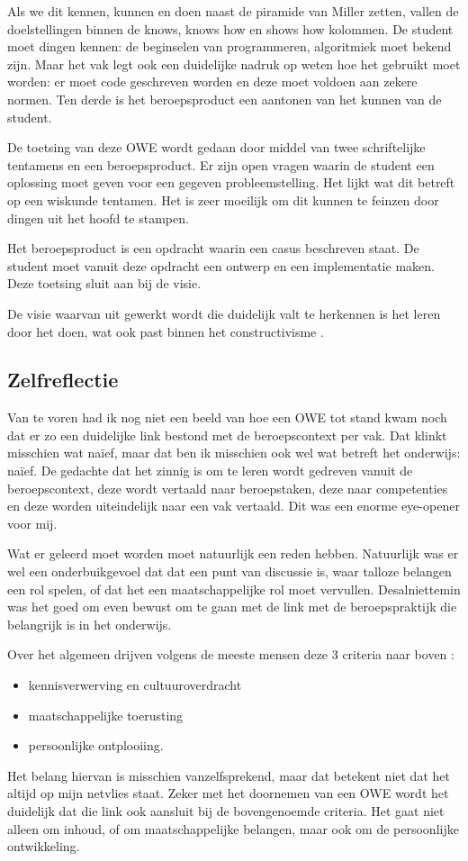 Als we dit kennen, kunnen en doen naast de piramide van Miller zetten, vallen de doelstellingen binnen de knows, knows how en shows how kolommen. De student moet dingen kennen: de beginselen van programmeren, algoritmiek moet bekend zijn. Maar het vak legt ook een duidelijke nadruk op weten hoe het gebruikt moet worden: er moet code geschreven worden en deze moet voldoen aan zekere normen. Ten derde is het beroepsproduct een aantonen van het kunnen van de student.

De toetsing van deze OWE wordt gedaan door middel van twee schriftelijke tentamens en een beroepsproduct. Er zijn open vragen waarin de student een oplossing moet geven voor een gegeven probleemstelling. Het lijkt wat dit betreft op een wiskunde tentamen. Het is zeer moeilijk om dit kunnen te feinzen door dingen uit het hoofd te stampen.

Het beroepsproduct is een opdracht waarin een casus beschreven staat. De student moet vanuit deze opdracht een ontwerp en een implementatie maken. Deze toetsing sluit aan bij de visie.

De visie waarvan uit gewerkt wordt die duidelijk valt te herkennen is het leren door het doen, wat ook past binnen het constructivisme \cite{keursten2006ontwikkeling}.
 
\subsection{Zelfreflectie}
Van te voren had ik nog niet een beeld van hoe een OWE tot stand kwam noch dat er zo een duidelijke link bestond met de beroepscontext per vak. Dat klinkt misschien wat naïef, maar dat ben ik misschien ook wel wat betreft het onderwijs: naïef. De gedachte dat het zinnig is om te leren wordt gedreven vanuit de beroepscontext, deze wordt vertaald naar beroepstaken, deze naar competenties en deze worden uiteindelijk naar een vak vertaald. Dit was een enorme eye-opener voor mij.

Wat er geleerd moet worden moet natuurlijk een reden hebben. Natuurlijk was er wel een onderbuikgevoel dat dat een punt van discussie is, waar talloze belangen een rol spelen, of dat het een maatschappelijke rol moet vervullen. Desalniettemin was het goed om even bewust om te gaan met de link met de beroepspraktijk die belangrijk is in het onderwijs.

Over het algemeen drijven volgens de meeste mensen deze 3 criteria naar boven \cite{thijs2009leerplan} :
\begin{itemize} 
  \item kennisverwerving en cultuuroverdracht
  \item maatschappelijke toerusting
  \item persoonlijke ontplooiing.
\end{itemize}
Het belang hiervan is misschien vanzelfsprekend, maar dat betekent niet dat het altijd op mijn netvlies staat. Zeker met het doornemen van een OWE wordt het duidelijk dat die link ook aansluit bij de bovengenoemde criteria. Het gaat niet alleen om inhoud, of om maatschappelijke belangen, maar ook om de persoonlijke ontwikkeling. 

